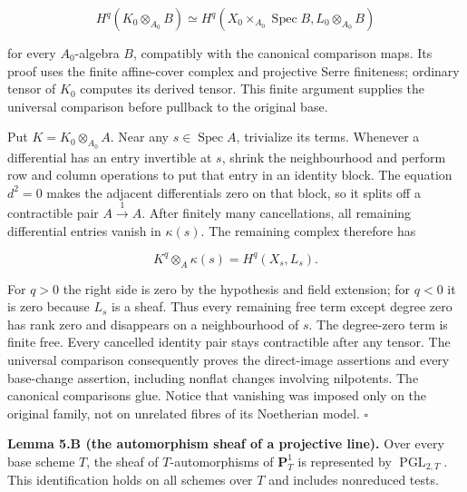 \documentclass[11pt,a4paper,openany]{report}
\begin{document}
\[
H^q(K_0\otimes_{A_0}B)
\simeq H^q(X_0\times_{A_0}\operatorname{Spec}B,L_0\otimes_{A_0}B)
\]

for every \(A_0\)-algebra \(B\), compatibly with the canonical comparison maps. Its proof uses the finite affine-cover complex and projective Serre finiteness; ordinary tensor of \(K_0\) computes its derived tensor. This finite argument supplies the universal comparison before pullback to the original base.

Put \(K=K_0\otimes_{A_0}A\). Near any \(s\in\operatorname{Spec}A\), trivialize its terms. Whenever a differential has an entry invertible at \(s\), shrink the neighbourhood and perform row and column operations to put that entry in an identity block. The equation \(d^2=0\) makes the adjacent differentials zero on that block, so it splits off a contractible pair \(A\xrightarrow{1}A\). After finitely many cancellations, all remaining differential entries vanish in \(\kappa(s)\). The remaining complex therefore has

\[
K^q\otimes_A\kappa(s)=H^q(X_s,L_s).
\]

For \(q>0\) the right side is zero by the hypothesis and field extension; for \(q<0\) it is zero because \(L_s\) is a sheaf. Thus every remaining free term except degree zero has rank zero and disappears on a neighbourhood of \(s\). The degree-zero term is finite free. Every cancelled identity pair stays contractible after any tensor. The universal comparison consequently proves the direct-image assertions and every base-change assertion, including nonflat changes involving nilpotents. The canonical comparisons glue. Notice that vanishing was imposed only on the original family, not on unrelated fibres of its Noetherian model. \(\square\)

\textbf{Lemma 5.B (the automorphism sheaf of a projective line).} Over every base scheme \(T\), the sheaf of \(T\)-automorphisms of \(\mathbf P^1_T\) is represented by \(\operatorname{PGL}_{2,T}\). This identification holds on all schemes over \(T\) and includes nonreduced tests.
\end{document}
